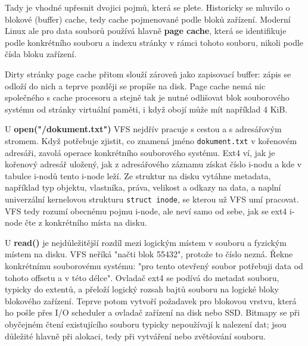 Tady je vhodné upřesnit dvojici pojmů, která se plete. Historicky se mluvilo o blokové (buffer) cache, tedy cache pojmenované podle bloků zařízení. Moderní Linux ale pro data souborů používá hlavně \textbf{page cache}, která se identifikuje podle konkrétního souboru a indexu stránky v rámci tohoto souboru, nikoli podle čísla bloku zařízení.

Dirty stránky page cache přitom slouží zároveň jako zapisovací buffer: zápis se odloží do nich a teprve později se propíše na disk. Page cache nemá nic společného s cache procesoru a stejně tak je nutné odlišovat blok souborového systému od stránky virtuální paměti, i když obojí může mít například 4 KiB.


U \textbf{open("/dokument.txt")} VFS nejdřív pracuje s cestou a s adresářovým stromem. Když potřebuje zjistit, co znamená jméno \texttt{dokument.txt} v kořenovém adresáři, zavolá operace konkrétního souborového systému. Ext4 ví, jak je kořenový adresář uložený, jak z adresářového záznamu získat číslo i-nodu a kde v tabulce i-nodů tento i-node leží. Ze struktur na disku vytáhne metadata, například typ objektu, vlastníka, práva, velikost a odkazy na data, a naplní univerzální kernelovou strukturu \texttt{struct inode}, se kterou už VFS umí pracovat. VFS tedy rozumí obecnému pojmu i-node, ale neví samo od sebe, jak se ext4 i-node čte z konkrétního místa na disku.

U \textbf{read()} je nejdůležitější rozdíl mezi logickým místem v souboru a fyzickým místem na disku. VFS neříká "načti blok 55432", protože to číslo nezná. Řekne konkrétnímu souborovému systému: "pro tento otevřený soubor potřebuji data od tohoto offsetu a v této délce". Ovladač ext4 se podívá do metadat souboru, typicky do extentů, a přeloží logický rozsah bajtů souboru na logické bloky blokového zařízení. Teprve potom vytvoří požadavek pro blokovou vrstvu, která ho pošle přes I/O scheduler a ovladač zařízení na disk nebo SSD. Bitmapy se při obyčejném čtení existujícího souboru typicky nepoužívají k nalezení dat; jsou důležité hlavně při alokaci, tedy při vytváření nebo zvětšování souboru.

